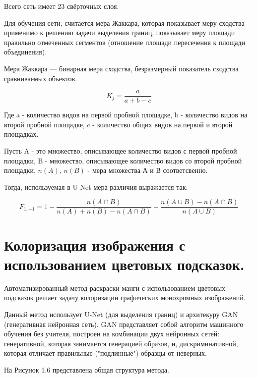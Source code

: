 Всего сеть имеет 23 свёрточных слоя.

Для обучения сети, считается мера Жаккара, которая показывает меру сходства — применимо к решению задачи выделения границ, показывает меру площади правильно отмеченных сегментов (отношение площади пересечения к площади объединения). 

Мера Жаккара — бинарная мера сходства, безразмерный показатель сходства сравниваемых объектов. 

\begin{equation}
K_j = \frac{a}{a + b - c}
\end{equation}


Где a - количество видов на первой пробной площадке, b - количество видов на второй пробной площадке, c - количество общих видов на первой и второй площадках.

Пусть A - это множество, описывающее количество видов с первой пробной площадки, B - множество, описывающее количество видов со второй пробной площадки, $n(A)$, $n(B)$ - мера множества А и В соответсвенно. 

Тогда, используемая в U-Net мера различия выражается так:

\begin{equation}
F_{1,-1} = 1 - \frac{n(A \cap B)}{n(A) + n(B) - n(A \cap B)} - \frac{n(A \cup B) - n(A \cap B)}{n(A \cup B)}
\end{equation}


\section {Колоризация изображения с использованием цветовых подсказок.}

Автоматизированный метод раскраски манги с использованием цветовых подсказок решает задачу колоризации графических
монохромных изображений.

Данный метод использует U-Net (для выделения границ) и архитекуру GAN (генеративная нейронная сеть). 
GAN представляет собой алгоритм машинного обучения без учителя, построен на комбинации двух нейронных сетей: генеративной, которая занимается генерацией образов, и, дискриминативной, которая отличает правильные ("подлинные") образцы от неверных. 

На Рисунок 1.6 представлена общая структура  метода.

\begin{figure}[ht!]
\end{figure}


